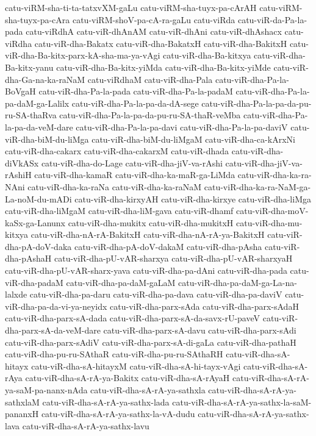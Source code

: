 {catu-viRM-sha-ti-ta-tatxvXM-gaLu
catu-viRM-sha-tuyx-pa-cArAH
catu-viRM-sha-tuyx-pa-cAra
catu-viRM-shoV-pa-cA-ra-gaLu
catu-viRda
catu-viR-da-Pa-la-pada
catu-viRdhA
catu-viR-dhAnAM
catu-viR-dhAni
catu-viR-dhAshacx
catu-viRdha
catu-viR-dha-Bakatx
catu-viR-dha-BakatxH
catu-viR-dha-BakitxH
catu-viR-dha-Ba-kitx-parx-kA-sha-ma-ya-vAgi
catu-viR-dha-Ba-kitxya
catu-viR-dha-Ba-kitx-yanu
catu-viR-dha-Ba-kitx-yiMda
catu-viR-dha-Ba-kitx-yiMde
catu-viR-dha-Ga-na-ka-raNaM
catu-viRdhaM
catu-viR-dha-Pala
catu-viR-dha-Pa-la-BoVgaH
catu-viR-dha-Pa-la-pada
catu-viR-dha-Pa-la-padaM
catu-viR-dha-Pa-la-pa-daM-ga-Lalilx
catu-viR-dha-Pa-la-pa-da-dA-sege
catu-viR-dha-Pa-la-pa-da-pu-ru-SA-thaRva
catu-viR-dha-Pa-la-pa-da-pu-ru-SA-thaR-veMba
catu-viR-dha-Pa-la-pa-da-veM-dare
catu-viR-dha-Pa-la-pa-davi
catu-viR-dha-Pa-la-pa-daviV
catu-viR-dha-biM-du-liMga
catu-viR-dha-biM-du-liMgaM
catu-viR-dha-ca-kArxNi
catu-viR-dha-cakarx
catu-viR-dha-cakarxM
catu-viR-dhada
catu-viR-dha-diVkASx
catu-viR-dha-do-Lage
catu-viR-dha-jiV-va-rAshi
catu-viR-dha-jiV-va-rAshiH
catu-viR-dha-kamaR
catu-viR-dha-ka-maR-ga-LiMda
catu-viR-dha-ka-ra-NAni
catu-viR-dha-ka-raNa
catu-viR-dha-ka-raNaM
catu-viR-dha-ka-ra-NaM-ga-La-noM-du-mADi
catu-viR-dha-kirxyAH
catu-viR-dha-kirxye
catu-viR-dha-liMga
catu-viR-dha-liMgaM
catu-viR-dha-liM-gava
catu-viR-dhamf
catu-viR-dha-moV-kaSx-ga-Lanunx
catu-viR-dha-mukitx
catu-viR-dha-mukitxH
catu-viR-dha-mu-kitxya
catu-viR-dha-nA-rA-BakitxH
catu-viR-dha-nA-rA-ya-BakitxH
catu-viR-dha-pA-doV-daka
catu-viR-dha-pA-doV-dakaM
catu-viR-dha-pAsha
catu-viR-dha-pAshaH
catu-viR-dha-pU-vAR-sharxya
catu-viR-dha-pU-vAR-sharxyaH
catu-viR-dha-pU-vAR-sharx-yava
catu-viR-dha-pa-dAni
catu-viR-dha-pada
catu-viR-dha-padaM
catu-viR-dha-pa-daM-gaLaM
catu-viR-dha-pa-daM-ga-La-na-lalxde
catu-viR-dha-pa-daru
catu-viR-dha-pa-dava
catu-viR-dha-pa-daviV
catu-viR-dha-pa-da-vi-ya-neyidx
catu-viR-dha-parx-sAda
catu-viR-dha-parx-sAdaH
catu-viR-dha-parx-sA-dada
catu-viR-dha-parx-sA-da-savx-rU-paveV
catu-viR-dha-parx-sA-da-veM-dare
catu-viR-dha-parx-sA-davu
catu-viR-dha-parx-sAdi
catu-viR-dha-parx-sAdiV
catu-viR-dha-parx-sA-di-gaLa
catu-viR-dha-pathaH
catu-viR-dha-pu-ru-SAthaR
catu-viR-dha-pu-ru-SAthaRH
catu-viR-dha-sA-hitayx
catu-viR-dha-sA-hitayxM
catu-viR-dha-sA-hi-tayx-vAgi
catu-viR-dha-sA-rAya
catu-viR-dha-sA-rA-ya-Bakitx
catu-viR-dha-sA-rAyaH
catu-viR-dha-sA-rA-ya-saM-pa-nanx-nAda
catu-viR-dha-sA-rA-ya-sathxla
catu-viR-dha-sA-rA-ya-sathxlaM
catu-viR-dha-sA-rA-ya-sathx-lada
catu-viR-dha-sA-rA-ya-sathx-la-saM-pananxH
catu-viR-dha-sA-rA-ya-sathx-la-vA-dudu
catu-viR-dha-sA-rA-ya-sathx-lava
catu-viR-dha-sA-rA-ya-sathx-lavu
}
